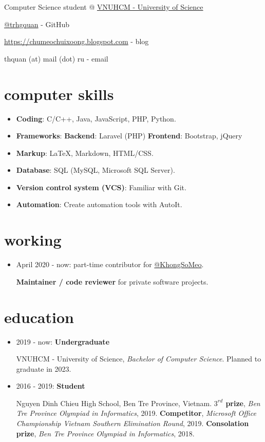 \documentclass{article}
\makeatletter
\renewcommand{\maketitle}{
\begin{multicols}{2}
\begin{flushleft}
{\huge\bfseries\theauthor}

Computer Science student @ \href{https://hcmus.edu.vn}{VNUHCM - University of Science}
\end{flushleft}

\columnbreak

\begin{flushright}

\href{https://github.com/trhgquan}{@trhgquan} - GitHub

\href{https://chumeochuixoong.blogspot.com}{https://chumeochuixoong.blogspot.com} - blog

thquan (at) mail (dot) ru - email
\end{flushright}
\end{multicols}
}
\makeatother
\begin{document}
\author{Quan, Tran Hoang}
\maketitle

\section{computer skills}
\begin{multicols}{2}
\begin{itemize}
\item \textbf{Coding}: C/C++, Java, JavaScript, PHP, Python.
\item \textbf{Frameworks}:
\subitem \textbf{Backend}: Laravel (PHP)
\subitem \textbf{Frontend}: Bootstrap, jQuery
\item \textbf{Markup}: \LaTeX, Markdown, HTML/CSS.
\columnbreak
\item \textbf{Database}: SQL (MySQL, Microsoft SQL Server).
\item \textbf{Version control system (VCS)}: Familiar with Git.
\item \textbf{Automation}: Create automation tools with AutoIt.
\end{itemize}
\end{multicols}

\section{working}
\begin{itemize}
\item April 2020 - now: part-time contributor for \href{https://github.com/khongsomeo}{@KhongSoMeo}.

\textbf{Maintainer / code reviewer} for private software projects.
\end{itemize}

\section{education}
\begin{itemize}
\item 2019 - now: \textbf{Undergraduate}

VNUHCM - University of Science, \textit{Bachelor of Computer Science}. Planned to graduate in 2023.

\item 2016 - 2019: \textbf{Student}

Nguyen Dinh Chieu High School, Ben Tre Province, Vietnam.
\subitem \textbf{$3^{rd}$ prize}, \textit{Ben Tre Province Olympiad in Informatics}, 2019.
\subitem \textbf{Competitor}, \textit{Microsoft Office Championship Vietnam Southern Elimination Round}, 2019.
\subitem \textbf{Consolation prize}, \textit{Ben Tre Province Olympiad in Informatics}, 2018.
\end{itemize}
\end{document}
